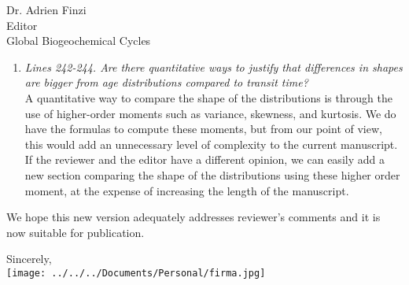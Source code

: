 \documentclass[11pt]{bgcletter}
\begin{document}
\begin{letter}{Dr. Adrien Finzi\\
 Editor \\ Global Biogeochemical Cycles}
\begin{enumerate}
\item {\it Lines 242-244. Are there quantitative ways to justify that differences in shapes are bigger from age distributions compared to transit time?} \\
	{\color{blue} A quantitative way to compare the shape of the distributions is through the use of higher-order moments such as variance, skewness, and kurtosis. We do have the formulas to compute these moments, but from our point of view, this would add an unnecessary level of complexity to the current manuscript. If the reviewer and the editor have a different opinion, we can easily add a new section comparing the shape of the distributions using these higher order moment, at the expense of increasing the length of the manuscript. }
\end{enumerate}

\vspace{2em}
We hope this new version adequately addresses reviewer's comments and it is now suitable for publication.

\closing{Sincerely, \\
 \texttt{[image: ../../../Documents/Personal/firma.jpg]}
 }
 \end{letter}

 
\end{document}
